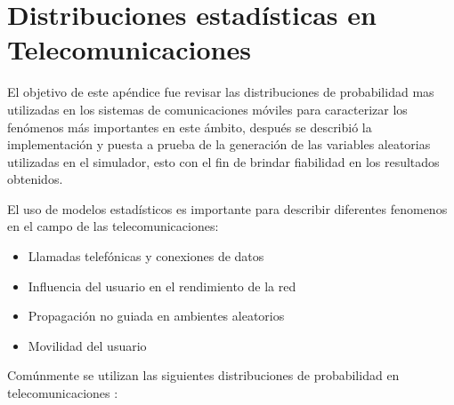 
\chapter{Distribuciones estadísticas en Telecomunicaciones} %

\label{AppendixA} %

El objetivo de este apéndice fue revisar las distribuciones de probabilidad mas utilizadas en los sistemas de comunicaciones móviles para caracterizar los fenómenos más importantes en este ámbito, después se describió la implementación y puesta a prueba de la generación de las variables aleatorias utilizadas en el simulador, esto con el fin de brindar fiabilidad en los resultados obtenidos.\newline


El uso de modelos estadísticos es importante para describir diferentes fenomenos en el campo de las telecomunicaciones\parencite{Correia2018}:
\begin{itemize}
    \item Llamadas telefónicas y conexiones de datos
    \item Influencia del usuario en el rendimiento de la red
    \item Propagación no guiada en ambientes aleatorios
    \item Movilidad del usuario
\end{itemize}

Comúnmente se utilizan las siguientes distribuciones de probabilidad en telecomunicaciones \parencite{Correia2018}:

